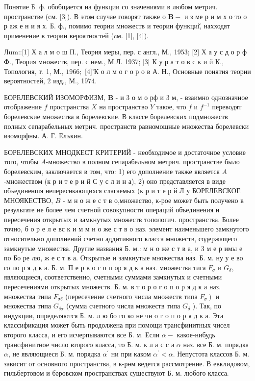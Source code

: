 \documentclass[10pt]{article}
\begin{document}
Понятие Б. ф. обобщается на функции со значениями в любом метрич. пространстве (см. [3]). В этом случае говорят также о $\boldsymbol{B}-$ и з ме р и м х о то о р аж е н и я х. Б. ф., помимо теории множеств и теории функциі̆, нахходят применение в теории вероятностей (cм. [1], [4]).



Лum::[1] Х а л м о ш П., Теория меры, пер. с англ., М., 1953; [2] Х а у с д о р ф Ф., Теория множеств, пер. с нем., М.Л. 1937; [3] К у р а т о в с к и й К., Топология, т. 1, М., $1966 ;$ [4]'К о л м о г о р о в А. Н., Основные понятия теории вероятностей, 2 изд., М., 1974.



БОРЕЛЕВСКИЙ ИЗОМОРФИЗМ, $\boldsymbol{B}$ - и 3 о м о рф и 3 м, - взаимно однозначное отображение $f$ пространства $X$ на пространство $Y$ такое, что $f$ и $f^{-1}$ переводят борелевские множества в борелевские. В классе борелевских подмножеств полных сепарабельных метрич. пространств равномощные множества борелевски изоморфны. А. Г. Елъкин.



БОРЕЛЕВСКИХ МНОДКЕСТ КРИТЕРИЙ - необходимое и достаточное условие того, чтобы $A$-множество в полном сепарабельном метрич. пространстве было борелевским, заключается в том, что: 1) его дополнение также является $A$-множеством (к р и т е р и й С у с л и н а), 2) оно представляется в виде объединеншя непересөкающихся слагаемых (к р и т е р й Л у БОРЕЛЕВСКОЕ МНОЯКЕСТВО, $B$ - м н о ж е с т в о,множество, к-рое может быть получено в результате не более чем счетной совокупности операций объединения и пересечения открытых и замкнутых множеств топологич. пространства. Более точно, б о р е л е вс к и м м н о же с т в о наз. элемент наименьшего замкнутого относительно дополнений счетно аддитивного класса множеств, содержащего замкнутые множества. Другие названия Б. м.: м н о же с т в а, и 3 м е р имы е по Бо ре лю, ж е с т в а. Открытые и замкнутые множества наз. Б. м. ну у е во го по р я д к а. Б. м. П е р в о г о п ор я д к а наз. множества тига $F_{\sigma}$ и $G_{\delta}$, являющиеся, соответственно, счетными суммами замкнутых и счетными пересечениями открытых множеств. Б. м. в т о р о г о п о р я д к а наз. множества типа $F_{\sigma \delta}$ (пересечение счетного числа множеств типа $\left.F_{\sigma}\right)$ и множества типа $G_{\delta \sigma}$ (сумма счетного числа множеств типа $G_{\delta}$ ). Так, по индукции, определяются Б. м. л ю бо го ко не чн о г о п о р я д к а. Эта классификация может быть продолжена при помощи трансфинитных чисел второго класса, и его исчерпываются все Б. м. Если $\alpha-$ какое-нибудь трансфинитное число второго класса, то Б. м. к л а с с а $\alpha$ наз. все Б. м. порядка $\alpha$, не являющиеся Б. м. порядка $\alpha^{\prime}$ ни при каком $\alpha^{\prime}<\alpha$. Непустота классов Б. м. зависит от основного пространства, в к-рөм ведется рассмотрение. В евклидовом, гильбертовом и бәровском пространствах существуют Б. м. любого класса.
\end{document}
